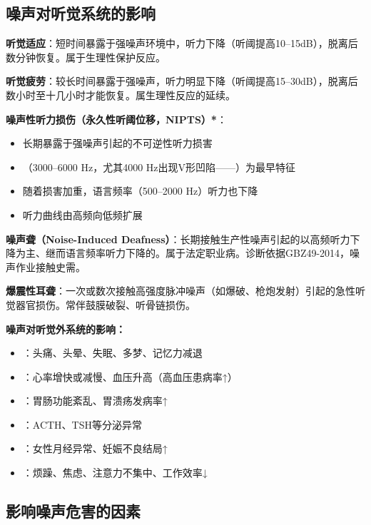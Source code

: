 \subsection{噪声对听觉系统的影响}

\begin{keybox}
\textbf{听觉适应}：短时间暴露于强噪声环境中，听力下降（听阈提高10--15dB），脱离后数分钟恢复。属于生理性保护反应。

\textbf{听觉疲劳}：较长时间暴露于强噪声，听力明显下降（听阈提高15--30dB），脱离后数小时至十几小时才能恢复。属生理性反应的延续。

\textbf{噪声性听力损伤（永久性听阈位移，NIPTS）*}：
\begin{itemize}[leftmargin=*]
    \item 长期暴露于强噪声引起的不可逆性听力损害
    \item {}（3000--6000 Hz，尤其4000 Hz出现V形凹陷——）为最早特征
    \item 随着损害加重，语言频率（500--2000 Hz）听力也下降
    \item 听力曲线由高频向低频扩展
\end{itemize}

\textbf{噪声聋（Noise-Induced Deafness）}：长期接触生产性噪声引起的以高频听力下降为主、继而语言频率听力下降的。属于法定职业病。诊断依据GBZ49-2014，噪声作业接触史需。

\textbf{爆震性耳聋}：一次或数次接触高强度脉冲噪声（如爆破、枪炮发射）引起的急性听觉器官损伤。常伴鼓膜破裂、听骨链损伤。

\textbf{噪声对听觉外系统的影响：}
\begin{itemize}[leftmargin=*]
    \item {}：头痛、头晕、失眠、多梦、记忆力减退
    \item {}：心率增快或减慢、血压升高（高血压患病率↑）
    \item {}：胃肠功能紊乱、胃溃疡发病率↑
    \item {}：ACTH、TSH等分泌异常
    \item {}：女性月经异常、妊娠不良结局↑
    \item {}：烦躁、焦虑、注意力不集中、工作效率↓
\end{itemize}
\end{keybox}

\subsection{影响噪声危害的因素}

